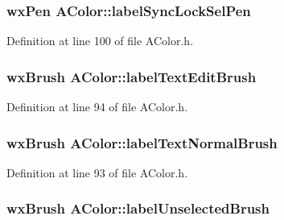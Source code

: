 \subsubsection[{\texorpdfstring{label\+Sync\+Lock\+Sel\+Pen}{labelSyncLockSelPen}}]{\setlength{\rightskip}{0pt plus 5cm}wx\+Pen A\+Color\+::label\+Sync\+Lock\+Sel\+Pen\hspace{0.3cm}{\ttfamily [static]}}\hypertarget{class_a_color_af9f21ecd91e87a8f53a24e45b8bcd536}{}\label{class_a_color_af9f21ecd91e87a8f53a24e45b8bcd536}


Definition at line 100 of file A\+Color.\+h.

\subsubsection[{\texorpdfstring{label\+Text\+Edit\+Brush}{labelTextEditBrush}}]{\setlength{\rightskip}{0pt plus 5cm}wx\+Brush A\+Color\+::label\+Text\+Edit\+Brush\hspace{0.3cm}{\ttfamily [static]}}\hypertarget{class_a_color_a7a5e22309e972fa25480cfa378d95a40}{}\label{class_a_color_a7a5e22309e972fa25480cfa378d95a40}


Definition at line 94 of file A\+Color.\+h.

\subsubsection[{\texorpdfstring{label\+Text\+Normal\+Brush}{labelTextNormalBrush}}]{\setlength{\rightskip}{0pt plus 5cm}wx\+Brush A\+Color\+::label\+Text\+Normal\+Brush\hspace{0.3cm}{\ttfamily [static]}}\hypertarget{class_a_color_a740811e4659d575a0c59a9ec1567ec60}{}\label{class_a_color_a740811e4659d575a0c59a9ec1567ec60}


Definition at line 93 of file A\+Color.\+h.

\subsubsection[{\texorpdfstring{label\+Unselected\+Brush}{labelUnselectedBrush}}]{\setlength{\rightskip}{0pt plus 5cm}wx\+Brush A\+Color\+::label\+Unselected\+Brush\hspace{0.3cm}{\ttfamily [static]}}\hypertarget{class_a_color_aaa92124859c6703dc9ff1ef31434be56}{}\label{class_a_color_aaa92124859c6703dc9ff1ef31434be56}


